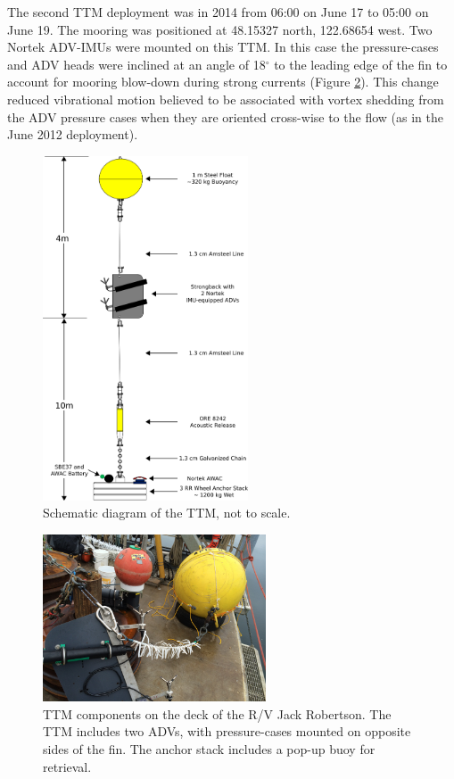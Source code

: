 \documentclass[twocol]{ametsoc}
\begin{document}
The second TTM deployment was in 2014 from 06:00 on June 17 to 05:00 on June 19. The mooring was positioned at 48.15327 north, 122.68654 west.  Two Nortek ADV-IMUs were mounted on this TTM. In this case the pressure-cases and ADV heads were inclined at an angle of 18$^\circ$ to the leading edge of the fin to account for mooring blow-down during strong currents (Figure \ref{fig:ttm:photo}). This change reduced vibrational motion believed to be associated with vortex shedding from the ADV pressure cases when they are oriented cross-wise to the flow (as in the June 2012 deployment).

\begin{figure}[t]
  \centering
  \includegraphics[width=2.4in]{ttm04b}
  \caption{Schematic diagram of the TTM, not to scale.}
  \label{fig:ttm:diagram}
\end{figure}

\begin{figure}[t]
  \centering
  \includegraphics[width=2.6in]{TTM_image01}  
  \caption{TTM components on the deck of the R/V Jack Robertson. The TTM includes two ADVs, with pressure-cases mounted on opposite sides of the fin. The anchor stack includes a pop-up buoy for retrieval. }
  \label{fig:ttm:photo}
\end{figure}
\end{document}
